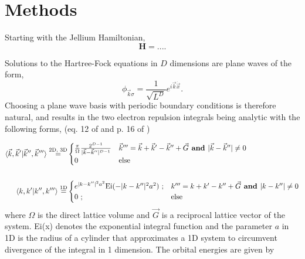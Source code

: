\documentclass{revtex4}
\begin{document}
\section{Methods}    
	
	Starting with the Jellium Hamiltonian, 
	\begin{equation}\label{hamiltonian}
		\mathbf{H} = ....
	\end{equation}
	
	Solutions to the Hartree-Fock equations in $D$ dimensions are plane waves of the form, 
	\begin{equation}\label{planewave}
		\phi_{\vec{k} \sigma} =
		   \frac{1} { \sqrt{L ^ D} } e ^ {i \vec{k} \dot \vec{x}}.
	\end{equation}
	Choosing a plane wave basis with periodic boundary conditions is therefore natural, and results in the two electron repulsion integrals being analytic with the following forms, (eq. 12 of \cite{Delyon2008} and p. 16 of \cite{Guiliani2005})
    
    \begin{subequations}
    	\begin{align}
    	\braket{\vec{k}, \vec{k}' | \vec{k}'', \vec{k}'''} 
    	  \stackrel{ \text{2D, 3D} }{=}&
    	\begin{cases} 
    	\frac{\pi} {\Omega} \frac{ 2^{D-1} } { | \vec{k} - \vec{k}'' | ^ {D-1} } 
    	& \vec{k}''' = \vec{k} + \vec{k}' - \vec{k}'' + \vec{G} \textbf{ and } | \vec{k} - \vec{k}''| \neq 0 \\
    	0 
    	& \text{else}
    	\end{cases}
    	\\ \nonumber \\
    	\braket{k, k' | k'', k'''} \stackrel{\text{1D}}{=}&
    	\begin{cases} 
    	e ^ { |k-k''|^2a^2 } \text{Ei} (-|k - k''|^2 a^2)\text{ ;}
    	& k''' = k + k' - k'' + \vec{G} \textbf{ and } |k - k''| \neq 0 \\
    	0\text{ ;} 
    	& \text{else}
    	\end{cases}
    	\end{align}
    \end{subequations}
    where $\Omega$ is the direct lattice volume and $\vec{G}$ is a reciprocal lattice vector of the system. Ei(x) denotes the exponential integral function and the parameter $a$ in 1D is the radius of a cylinder that approximates a 1D system to circumvent divergence of the integral in 1 dimension. The orbital energies are given 
    by 
    
\end{document}
